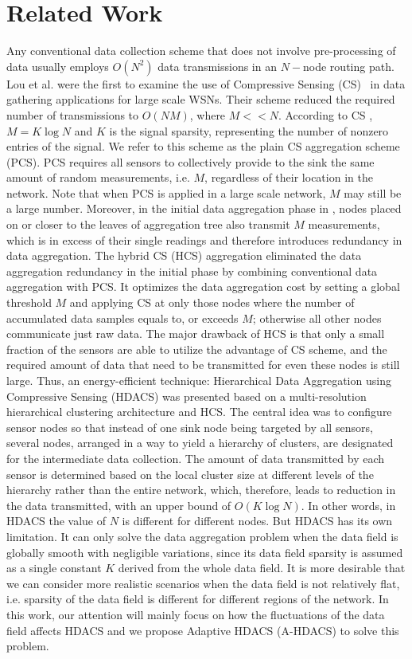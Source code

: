 \documentclass[conference]{IEEEtran}
\begin{document}
\section{Related Work}
Any conventional data collection scheme that does not involve pre-processing of data usually 
employs $O(N^2)$ data transmissions
in an $N-$node routing path. Lou et al. \cite{BalCS} were the first to examine the use of 
Compressive Sensing (CS)~\cite{CS} \cite{CS_Richard} in data gathering applications  
for large scale WSNs. Their scheme reduced the 
required number of transmissions to $O(NM)$, where $M << N$. 
According to CS \cite{CS},  $M=K \log{N}$ and $K$ is the 
signal sparsity, representing the number of nonzero entries of the signal. 
We refer to this scheme as the plain CS aggregation scheme (PCS). 
PCS requires all sensors to collectively provide to the sink
the same amount of random measurements, i.e. $M$, regardless of their location in the network. 
Note that when PCS is applied in a large scale network, $M$ may still be a large number. 
Moreover, in the initial data aggregation phase in \cite{BalCS}, nodes placed on or closer to the leaves of aggregation tree 
also transmit $M$ measurements, which is in excess of their single readings and therefore introduces redundancy in 
data aggregation.  The hybrid CS (HCS) aggregation \cite{HybridCS1}\cite{HybridCS2} 
eliminated the data aggregation redundancy in the initial phase by combining conventional data aggregation with PCS. 
It optimizes the data aggregation cost by setting a global threshold $M$ and applying CS at only those nodes 
where the number of accumulated data samples equals to, or exceeds $M$; otherwise all other nodes communicate just raw data. 
The major drawback of HCS is that only a small fraction of the sensors are able to utilize the advantage of CS scheme, 
and the required amount of data that need to be transmitted for even these nodes is still large.
Thus, an energy-efficient technique: Hierarchical Data Aggregation using Compressive Sensing (HDACS) 
\cite{HDACS} was presented based on a multi-resolution hierarchical clustering architecture and HCS. 
The central idea was to configure sensor nodes so that instead of one sink node being targeted by all sensors, several nodes, 
arranged in a way to yield a hierarchy of clusters, are designated for the intermediate data collection. 
The amount of data transmitted by each sensor is determined based on the local cluster size 
at different levels of the hierarchy rather than the entire network, which, therefore, leads to reduction
in the data transmitted, with an upper bound of $O(K\log{N})$. In other words, in HDACS the value of $N$ is different for 
different nodes. But HDACS has its own limitation. It can only solve the data aggregation problem when the data field is globally smooth with 
negligible variations, since its data field sparsity is assumed as a single constant $K$ derived from the whole data field. 
It is more desirable that we can consider more realistic scenarios when the data 
field is not relatively flat, i.e. sparsity of the data field is different for different regions of the network. 
In this work, our attention will mainly focus on 
how the fluctuations of the data field affects HDACS and we propose Adaptive HDACS (A-HDACS) to solve this problem.
\end{document}
